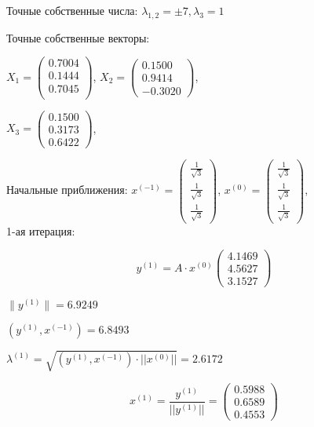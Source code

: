\documentclass{article}
\begin{document}
	Точные собственные числа:
	$\lambda_{1,2} = \pm 7 , \lambda_3 = 1$
	
	Точные собственные векторы:
	
	$X_1 = \begin{pmatrix}
		0.7004\\
		0.1444\\
		0.7045\\
	\end{pmatrix}$,
	$X_2 =\begin{pmatrix}
		0.1500\\
		0.9414\\
		-0.3020
	\end{pmatrix}$,
	
	$X_3 =\begin{pmatrix}
		0.1500\\
		0.3173\\
		0.6422
	\end{pmatrix}$,
	
	Начальные приближения:
	$x^{(-1)}=\begin{pmatrix}
		\frac{1}{\sqrt{3}}\\
		\frac{1}{\sqrt{3}}\\
		\frac{1}{\sqrt{3}}
	\end{pmatrix}$,
	$x^{(0)}=\begin{pmatrix}
		\frac{1}{\sqrt{3}}\\
		\frac{1}{\sqrt{3}}\\
		\frac{1}{\sqrt{3}}
	\end{pmatrix}$,
	~\\
	
	1-ая итерация:
	
	\[y^{(1)} = A \cdot x^{(0)}							
	\left(
	\begin{array}{ccc}
		4.1469 \\
		4.5627 \\
		3.1527
	\end{array}
	\right) \] 
	
	$\|y^{(1)}\| = 6.9249$
	
	$({y^{(1)}},{x^{(-1)}}) = 6.8493$
	
	$\lambda^{(1)} = \sqrt {{({y^{(1)}},{x^{(-1)}})} \cdot ||x^{(0)}||} =  2.6172$
	
	
	\[x^{(1)} = \frac{y^{(1)}}{||y^{(1)}||}= 							
	\left(
	\begin{array}{ccc}
		0.5988  \\
		0.6589  \\
		0.4553
	\end{array}
	\right) \] 
	
\end{document}
